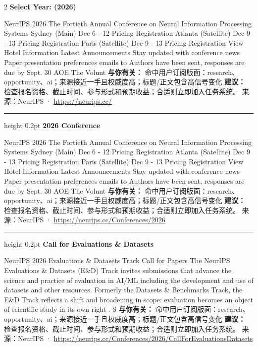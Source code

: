 \documentclass[10.5pt]{ctexart}
\begin{document}
\begin{multicols}{2}
{\large\bfseries Select Year: (2026)}\par
NeurIPS 2026 The Fortieth Annual Conference on Neural Information Processing Systems Sydney (Main) Dec 6 - 12 Pricing Registration Atlanta (Satellite) Dec 9 - 13 Pricing Registration Paris (Satellite) Dec 9 - 13 Pricing Registration View Hotel Information Latest Announcements Stay updated with conference news Paper presentation preferences emails to Authors have been sent, responses are due by Sept. 30 AOE The Volunt
\textbf{与你有关：} 命中用户订阅版面：research、opportunity、ai；来源接近一手且权威度高；标题/正文包含高信号变化
\textbf{建议：} 检查报名资格、截止时间、参与形式和预期收益；合适则立即加入任务系统。
{\footnotesize\color{ormuted} 来源：NeurIPS · \url{https://neurips.cc/}}
\vspace{2mm}
\hrule height 0.2pt
\vspace{2mm}
{\large\bfseries 2026 Conference}\par
NeurIPS 2026 The Fortieth Annual Conference on Neural Information Processing Systems Sydney (Main) Dec 6 - 12 Pricing Registration Atlanta (Satellite) Dec 9 - 13 Pricing Registration Paris (Satellite) Dec 9 - 13 Pricing Registration View Hotel Information Latest Announcements Stay updated with conference news Paper presentation preferences emails to Authors have been sent, responses are due by Sept. 30 AOE The Volunt
\textbf{与你有关：} 命中用户订阅版面：research、opportunity、ai；来源接近一手且权威度高；标题/正文包含高信号变化
\textbf{建议：} 检查报名资格、截止时间、参与形式和预期收益；合适则立即加入任务系统。
{\footnotesize\color{ormuted} 来源：NeurIPS · \url{https://neurips.cc/Conferences/2026}}
\vspace{2mm}
\hrule height 0.2pt
\vspace{2mm}
{\large\bfseries Call for Evaluations \& Datasets}\par
NeurIPS 2026 Evaluations \& Datasets Track Call for Papers The NeurIPS Evaluations \& Datasets (E\&D) Track invites submissions that advance the science and practice of evaluation in AI/ML including the development and use of datasets and other resources. Formerly the Datasets \& Benchmarks Track, the E\&D Track reflects a shift and broadening in scope: evaluation becomes an object of scientific study in its own right . S
\textbf{与你有关：} 命中用户订阅版面：research、opportunity、ai；来源接近一手且权威度高；标题/正文包含高信号变化
\textbf{建议：} 检查报名资格、截止时间、参与形式和预期收益；合适则立即加入任务系统。
{\footnotesize\color{ormuted} 来源：NeurIPS · \url{https://neurips.cc/Conferences/2026/CallForEvaluationsDatasets}}

\end{multicols}
\end{document}
